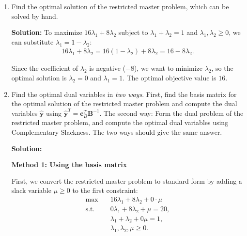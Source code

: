 \documentclass[11pt]{article}
\newcommand{\mb}[1]{\ensuremath{\boldsymbol{#1}}}
\begin{document}
\begin{enumerate}
\begin{enumerate}
Therefore, the restricted master problem is:
\begin{align*}
\max \quad & 16\lambda_1 + 8\lambda_2 \\
\text{s.t.} \quad & 0 \cdot \lambda_1 + 8 \cdot \lambda_2 \leq 20, \\
                       & \lambda_1 + \lambda_2 = 1, \\
                       & \lambda_1, \lambda_2 \geq 0.
\end{align*}

Simplifying the first constraint: $8\lambda_2 \leq 20$, which gives $\lambda_2 \leq \frac{5}{2}$. Since $\lambda_1 + \lambda_2 = 1$ and $\lambda_1, \lambda_2 \geq 0$, this constraint is automatically satisfied (as $\lambda_2 \leq 1 \leq \frac{5}{2}$).

\item Find the optimal solution of the restricted master problem, which can be solved by hand.

\textbf{Solution:} To maximize $16\lambda_1 + 8\lambda_2$ subject to $\lambda_1 + \lambda_2 = 1$ and $\lambda_1, \lambda_2 \geq 0$, we can substitute $\lambda_1 = 1 - \lambda_2$:
\begin{align*}
16\lambda_1 + 8\lambda_2 = 16(1 - \lambda_2) + 8\lambda_2 = 16 - 8\lambda_2.
\end{align*}

Since the coefficient of $\lambda_2$ is negative ($-8$), we want to minimize $\lambda_2$, so the optimal solution is $\lambda_2 = 0$ and $\lambda_1 = 1$. The optimal objective value is $16$.

\item Find the optimal dual variables in \textit{two ways}. First, find the basis matrix for the optimal solution of the restricted master problem and compute the dual variables $\hat{\mb{y}}$ using $\hat{\mb{y}}^T=\mb{c}_B^T\mb{B}^{-1}$. The second way: Form the dual problem of the restricted master problem, and compute the optimal dual variables using Complementary Slackness. The two ways should give the same answer.

\textbf{Solution:}

\textbf{Method 1: Using the basis matrix}

First, we convert the restricted master problem to standard form by adding a slack variable $\mu \geq 0$ to the first constraint:
\begin{align*}
\max \quad & 16\lambda_1 + 8\lambda_2 + 0 \cdot \mu \\
\text{s.t.} \quad & 0\lambda_1 + 8\lambda_2 + \mu = 20, \\
                       & \lambda_1 + \lambda_2 + 0\mu = 1, \\
                       & \lambda_1, \lambda_2, \mu \geq 0.
\end{align*}


\end{enumerate}
\end{enumerate}
\end{document}
